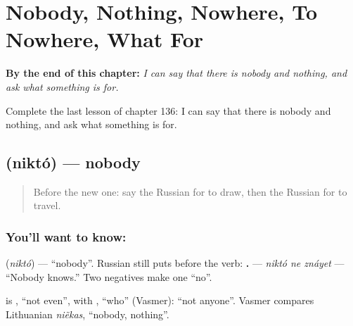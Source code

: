 
\chapter{Nobody, Nothing, Nowhere, To Nowhere, What For}
\label{ch:ru-nobody-nothing-nowhere-to-nowhere-what-for}

\begin{chapteropening}
\textbf{By the end of this chapter:} \emph{I can say that there is nobody and nothing, and ask what something is for.}

Complete the last lesson of chapter 136: I can say that there is nobody and nothing, and ask what something is for.
\end{chapteropening}

\section[\texorpdfstring{\ru{никто} (niktó)}{никто (niktó)}]{ (niktó) — nobody}

\label{lesson:RU-C136-nikto}



\begin{quote}
Before the new one: say the Russian for to draw, then the Russian for to travel.
\end{quote}

\subsection*{You'll want to know: }
\textbf{} (\emph{niktó}) — \textquotedblleft{}nobody\textquotedblright{}. Russian still puts \textbf{} before the verb: \textbf{  .} — \emph{niktó ne znáyet} — \textquotedblleft{}Nobody knows.\textquotedblright{} Two negatives make one \textquotedblleft{}no\textquotedblright{}.

\begin{cousinweb}
\textbf{} is \emph{}, \textquotedblleft{}not even\textquotedblright{}, with \emph{}, \textquotedblleft{}who\textquotedblright{} (Vasmer): \textquotedblleft{}not anyone\textquotedblright{}. Vasmer compares Lithuanian \emph{niẽkas}, \textquotedblleft{}nobody, nothing\textquotedblright{}.
\end{cousinweb}

